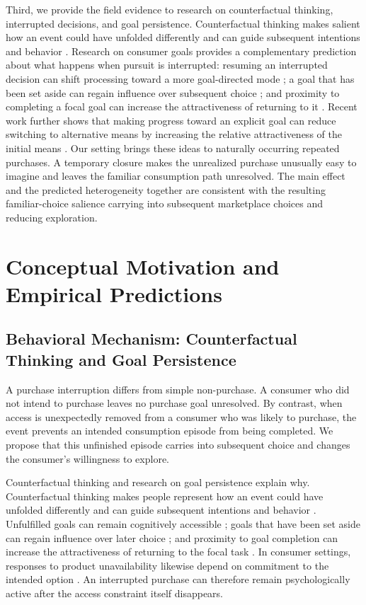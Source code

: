 \documentclass[11 pt]{article}
\begin{document}
Third, we provide the field evidence to research on counterfactual thinking, interrupted decisions, and goal persistence. Counterfactual thinking makes salient how an event could have unfolded differently and can guide subsequent intentions and behavior \citep{roese1994functional,epstude2008functional}. Research on consumer goals provides a complementary prediction about what happens when pursuit is interrupted: resuming an interrupted decision can shift processing toward a more goal-directed mode \citep{liu2008focusing}; a goal that has been set aside can regain influence over subsequent choice \citep{carlson2013goal}; and proximity to completing a focal goal can increase the attractiveness of returning to it \citep{jhang2015interruption}. Recent work further shows that making progress toward an explicit goal can reduce switching to alternative means by increasing the relative attractiveness of the initial means \citep{friedman2025road}. Our setting brings these ideas to naturally occurring repeated purchases. A temporary closure makes the unrealized purchase unusually easy to imagine and leaves the familiar consumption path unresolved. The main effect and the predicted heterogeneity together are consistent with the resulting familiar-choice salience carrying into subsequent marketplace choices and reducing exploration.


\section{Conceptual Motivation and Empirical Predictions}

\subsection{Behavioral Mechanism: Counterfactual Thinking and Goal Persistence}

A purchase interruption differs from simple non-purchase. A consumer who did not intend to purchase leaves no purchase goal unresolved. By contrast, when access is unexpectedly removed from a consumer who was likely to purchase, the event prevents an intended consumption episode from being completed. We propose that this unfinished episode carries into subsequent choice and changes the consumer's willingness to explore.

Counterfactual thinking and research on goal persistence explain why. Counterfactual thinking makes people represent how an event could have unfolded differently and can guide subsequent intentions and behavior \citep{epstude2008functional}. Unfulfilled goals can remain cognitively accessible \citep{masicampo2011consider}; goals that have been set aside can regain influence over later choice \citep{carlson2013goal}; and proximity to goal completion can increase the attractiveness of returning to the focal task \citep{jhang2015interruption}. In consumer settings, responses to product unavailability likewise depend on commitment to the intended option \citep{fitzsimons2000consumer}. An interrupted purchase can therefore remain psychologically active after the access constraint itself disappears.
\end{document}
